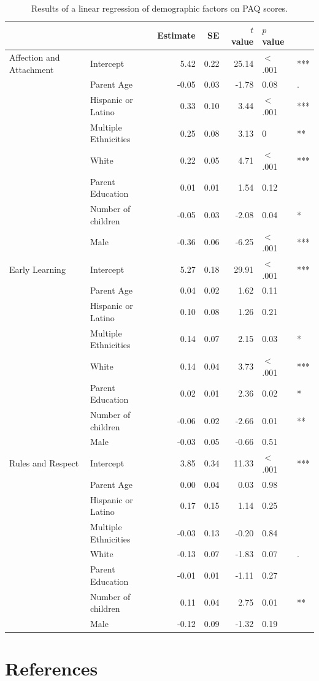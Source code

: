 \documentclass[floatsintext,man]{apa6}
\theoremstyle{definition}
\theoremstyle{definition}
\theoremstyle{definition}
\theoremstyle{remark}
\begin{document}
\begin{table}[b]
\centering
\begin{tabular}{llrrrll}
  &  & Estimate & SE & $t$ value & $p$ value &  \\ 
  \hline
Affection and Attachment & Intercept & 5.42 & 0.22 & 25.14 & $<$ .001 & *** \\ 
   & Parent Age & -0.05 & 0.03 & -1.78 & 0.08 & . \\ 
   & Hispanic or Latino & 0.33 & 0.10 & 3.44 & $<$ .001 & *** \\ 
   & Multiple Ethnicities & 0.25 & 0.08 & 3.13 & 0 & ** \\ 
   & White & 0.22 & 0.05 & 4.71 & $<$ .001 & *** \\ 
   & Parent Education & 0.01 & 0.01 & 1.54 & 0.12 &  \\ 
   & Number of children & -0.05 & 0.03 & -2.08 & 0.04 & * \\ 
   & Male & -0.36 & 0.06 & -6.25 & $<$ .001 & *** \\ 
   \hline
Early Learning & Intercept & 5.27 & 0.18 & 29.91 & $<$ .001 & *** \\ 
   & Parent Age & 0.04 & 0.02 & 1.62 & 0.11 &  \\ 
   & Hispanic or Latino & 0.10 & 0.08 & 1.26 & 0.21 &  \\ 
   & Multiple Ethnicities & 0.14 & 0.07 & 2.15 & 0.03 & * \\ 
   & White & 0.14 & 0.04 & 3.73 & $<$ .001 & *** \\ 
   & Parent Education & 0.02 & 0.01 & 2.36 & 0.02 & * \\ 
   & Number of children & -0.06 & 0.02 & -2.66 & 0.01 & ** \\ 
   & Male & -0.03 & 0.05 & -0.66 & 0.51 &  \\ 
   \hline
Rules and Respect & Intercept & 3.85 & 0.34 & 11.33 & $<$ .001 & *** \\ 
   & Parent Age & 0.00 & 0.04 & 0.03 & 0.98 &  \\ 
   & Hispanic or Latino & 0.17 & 0.15 & 1.14 & 0.25 &  \\ 
   & Multiple Ethnicities & -0.03 & 0.13 & -0.20 & 0.84 &  \\ 
   & White & -0.13 & 0.07 & -1.83 & 0.07 & . \\ 
   & Parent Education & -0.01 & 0.01 & -1.11 & 0.27 &  \\ 
   & Number of children & 0.11 & 0.04 & 2.75 & 0.01 & ** \\ 
   & Male & -0.12 & 0.09 & -1.32 & 0.19 &  \\ 
  \end{tabular}
\caption{Results of a linear regression of demographic factors on  PAQ scores.} 
\end{table}

\newpage

\section{References}\label{references}

\begingroup
\setlength{\parindent}{-0.5in} \setlength{\leftskip}{0.5in}

\hypertarget{refs}{}

\endgroup
\end{document}

